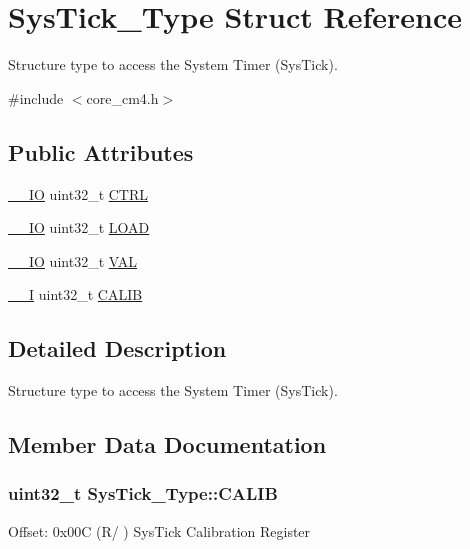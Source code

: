 \hypertarget{struct_sys_tick___type}{}\section{Sys\+Tick\+\_\+\+Type Struct Reference}
\label{struct_sys_tick___type}


Structure type to access the System Timer (Sys\+Tick).  




{\ttfamily \#include $<$core\+\_\+cm4.\+h$>$}

\subsection*{Public Attributes}
\begin{DoxyCompactItemize}
\item 
\hyperlink{core__cm4_8h_aec43007d9998a0a0e01faede4133d6be}{\+\_\+\+\_\+\+IO} uint32\+\_\+t \hyperlink{struct_sys_tick___type_af2ad94ac83e5d40fc6e34884bc1bec5f}{C\+T\+RL}
\item 
\hyperlink{core__cm4_8h_aec43007d9998a0a0e01faede4133d6be}{\+\_\+\+\_\+\+IO} uint32\+\_\+t \hyperlink{struct_sys_tick___type_ae7bc9d3eac1147f3bba8d73a8395644f}{L\+O\+AD}
\item 
\hyperlink{core__cm4_8h_aec43007d9998a0a0e01faede4133d6be}{\+\_\+\+\_\+\+IO} uint32\+\_\+t \hyperlink{struct_sys_tick___type_a0997ff20f11817f8246e8f0edac6f4e4}{V\+AL}
\item 
\hyperlink{core__cm4_8h_af63697ed9952cc71e1225efe205f6cd3}{\+\_\+\+\_\+I} uint32\+\_\+t \hyperlink{struct_sys_tick___type_a9c9eda0ea6f6a7c904d2d75a6963e238}{C\+A\+L\+IB}
\end{DoxyCompactItemize}


\subsection{Detailed Description}
Structure type to access the System Timer (Sys\+Tick). 

\subsection{Member Data Documentation}
\subsubsection[{\texorpdfstring{C\+A\+L\+IB}{CALIB}}]{ uint32\+\_\+t Sys\+Tick\+\_\+\+Type\+::\+C\+A\+L\+IB}\hypertarget{struct_sys_tick___type_a9c9eda0ea6f6a7c904d2d75a6963e238}{}\label{struct_sys_tick___type_a9c9eda0ea6f6a7c904d2d75a6963e238}
Offset\+: 0x00C (R/ ) Sys\+Tick Calibration Register 
